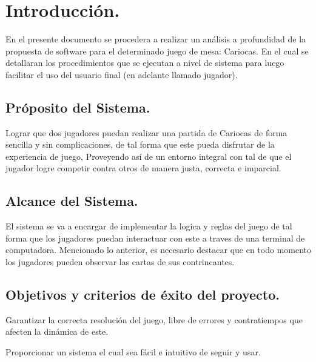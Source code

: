 \documentclass[60pt]{article}
\begin{document}
\newpage
\pagestyle{mypagestyle}
\tableofcontents

\newpage



\section{Introducción.}\label{cap:intro}

En el presente documento se procedera a realizar un análisis a profundidad de la propuesta de software para el determinado juego de mesa: Cariocas. En el cual se detallaran los procedimientos que se ejecutan a nivel de sistema para luego facilitar el uso del usuario final (en adelante llamado jugador).



\subsection{Próposito del Sistema.}\label{cap:proposito}
Lograr que dos jugadores puedan realizar una partida de Cariocas de forma sencilla y sin complicaciones, de tal forma que este pueda disfrutar de la experiencia de juego,
Proveyendo así de un entorno integral con tal de que el jugador logre competir contra otros de manera justa, correcta
e imparcial.

\subsection{Alcance del Sistema.}\label{cap:alcance}
El sistema se va a encargar de implementar la logica y reglas del juego de tal forma que los jugadores puedan interactuar con este a traves de una terminal de computadora. Mencionado lo anterior, es necesario destacar que en todo momento los jugadores pueden observar las cartas de sus contrincantes.

\subsection{Objetivos y criterios de éxito del proyecto.}\label{cap:objetivos}
Garantizar la correcta resolución del juego, libre de errores y contratiempos que afecten la dinámica de este.

Proporcionar un sistema el cual sea fácil e intuitivo de seguir y usar.
\end{document}

